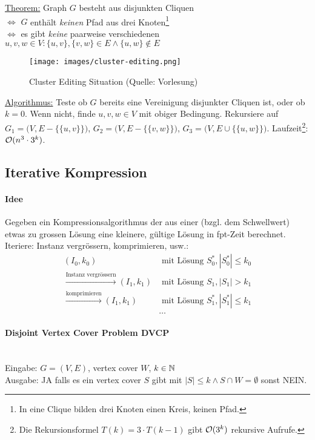 \underline{Theorem:}
Graph $G$ besteht aus disjunkten Cliquen \\
$\iff$ $G$ enthält \emph{keinen} Pfad aus drei Knoten\footnote{In eine Clique bilden drei Knoten einen Kreis, keinen Pfad.}\\
$\iff$ es gibt \emph{keine} paarweise verschiedenen $u, v, w \in V : \{u,v\}, \{v,w\} \in E \wedge \{u,w\} \notin E$

\begin{figure}[h]
    \centering
    \texttt{[image: images/cluster-editing.png]}
    \caption{Cluster Editing Situation (Quelle: Vorlesung)}
    \label{fig:cluster-editing}
\end{figure}

\underline{Algorithmus:}
Teste ob $G$ bereits eine Vereinigung disjunkter Cliquen ist, oder ob $k=0$.
Wenn nicht, finde $u,v,w \in V$ mit obiger Bedingung.
Rekursiere auf
$G_1 = \big(V, E   -  \{ \{u,v\} \} \big)$,
$G_2 = \big(V, E   -  \{ \{v,w\} \} \big)$,
$G_3 = \big(V, E \cup \{ \{u,w\} \} \big)$.
Laufzeit\footnote{Die Rekursionsformel $T(k) = 3 \cdot T(k-1)$ gibt $\mathcal{O} (3^k)$ rekursive Aufrufe.}:
$\mathcal{O} (n^3 \cdot 3^k)$.


\subsection{Iterative Kompression}

\paragraph{Idee}
Gegeben ein Kompressionsalgorithmus der aus einer (bzgl. dem Schwellwert) etwas zu grossen Lösung eine kleinere,
gültige Lösung in fpt-Zeit berechnet.
Iteriere: Instanz vergrössern, komprimieren, usw.:
\\
\begin{align*}
(I_0, k_0) & \text{ mit Lösung } S_0^*, |S_0^*| \leq k_0 \\
\xrightarrow{\text{Instanz vergrössern}}
(I_1, k_1) & \text{ mit Lösung } S_1,   |S_1|   > k_1 \\
\xrightarrow{\text{komprimieren}}
(I_1, k_1) & \text{ mit Lösung } S_1^*, |S_1^*| \leq k_1 \\
& \dots
\end{align*}

\paragraph{Disjoint Vertex Cover Problem DVCP} \mbox{} \\
Eingabe: $G=(V,E)$, vertex cover $W$, $k \in \mathbb{N}$ \\
Ausgabe: JA falls es ein vertex cover $S$ gibt mit $|S| \leq k \wedge S \cap W = \emptyset$ sonst NEIN.

